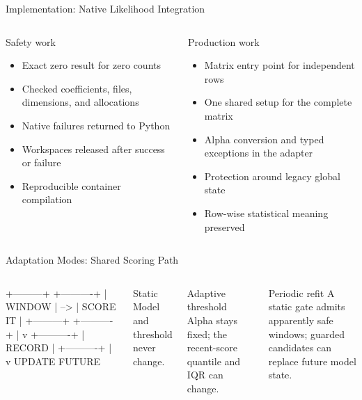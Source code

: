 \documentclass[aspectratio=169,10pt]{beamer}
\begin{document}
\begin{frame}{Implementation: Native Likelihood Integration}
\begin{columns}[T,onlytextwidth]
\begin{block}{Safety work}
\begin{itemize}
  \item Exact zero result for zero counts
  \item Checked coefficients, files, dimensions, and allocations
  \item Native failures returned to Python
  \item Workspaces released after success or failure
  \item Reproducible container compilation
\end{itemize}
\end{block}

\begin{block}{Production work}
\begin{itemize}
  \item Matrix entry point for independent rows
  \item One shared setup for the complete matrix
  \item Alpha conversion and typed exceptions in the adapter
  \item Protection around legacy global state
  \item Row-wise statistical meaning preserved
\end{itemize}
\end{block}
\end{columns}

\end{frame}

\begin{frame}[fragile]{Adaptation Modes: Shared Scoring Path}
\begin{columns}[T,onlytextwidth]
\begin{asciiart}
+---------+     +----------+
| WINDOW  | --> | SCORE IT |
+---------+     +----------+
                       |
                       v
                  +----------+
                  | RECORD   |
                  +----------+
                       |
                       v
                  UPDATE FUTURE
\end{asciiart}

\begin{block}{Static}
Model and threshold never change.
\end{block}
\begin{block}{Adaptive threshold}
Alpha stays fixed; the recent-score quantile and IQR can change.
\end{block}
\begin{block}{Periodic refit}
A static gate admits apparently safe windows; guarded candidates can replace
future model state.
\end{block}
\end{columns}

\end{frame}
\end{document}
